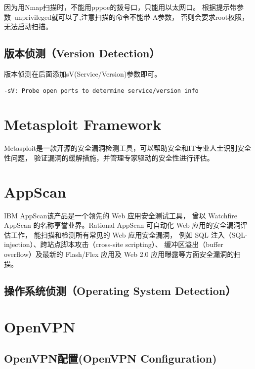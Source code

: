 \documentclass{book}
\begin{document}
因为用Nmap扫描时，不能用pppoe的拨号口，只能用以太网口。
根据提示带参数--unprivileged就可以了,注意扫描的命令不能带-A参数，
否则会要求root权限，无法启动扫描。 


\subsection{版本侦测（Version Detection）}

版本侦测在后面添加sV(Service/Version)参数即可。

\begin{lstlisting}[language=Bash]
 -sV: Probe open ports to determine service/version info
\end{lstlisting}

\section{Metasploit Framework}

Metasploit是一款开源的安全漏洞检测工具，可以帮助安全和IT专业人士识别安全性问题，
验证漏洞的缓解措施，并管理专家驱动的安全性进行评估。




\section{AppScan}

IBM AppScan该产品是一个领先的 Web 应用安全测试工具，
曾以 Watchfire AppScan 的名称享誉业界。Rational AppScan 可自动化 Web 应用的安全漏洞评估工作，
能扫描和检测所有常见的 Web 应用安全漏洞，
例如 SQL 注入（SQL-injection）、跨站点脚本攻击（cross-site scripting）、
缓冲区溢出（buffer overflow）及最新的 Flash/Flex 应用及 Web 2.0 应用曝露等方面安全漏洞的扫描。


\subsection{操作系统侦测（Operating System Detection）}

\section{OpenVPN}





\subsection{OpenVPN配置(OpenVPN Configuration)}
\end{document}
